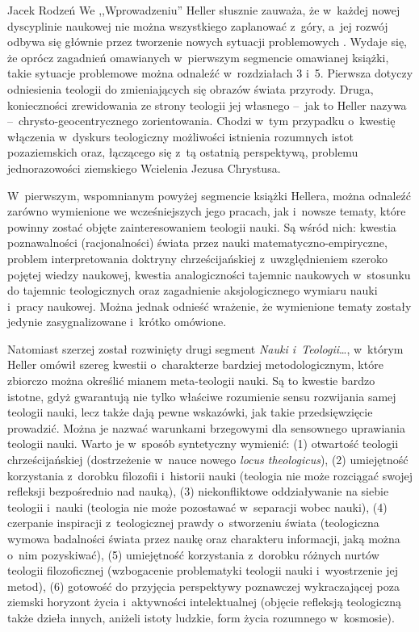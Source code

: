 \begin{newrevplenv}{Jacek Rodzeń}
We ,,Wprowadzeniu'' Heller słusznie zauważa, że w~każdej nowej dyscyplinie naukowej nie można wszystkiego zaplanować z~góry, a~jej rozwój odbywa się głównie przez tworzenie nowych sytuacji problemowych
\parencite[][s.~16]{heller_nauka_2019}. %
 Wydaje się, że oprócz zagadnień omawianych w~pierwszym segmencie omawianej książki, takie sytuacje problemowe można odnaleźć w~rozdziałach 3 i~5. Pierwsza dotyczy odniesienia teologii do zmieniających się obrazów świata przyrody. Druga, konieczności zrewidowania ze strony teologii jej własnego --~jak to Heller nazywa --~chrysto-geocentrycznego zorientowania. Chodzi w~tym przypadku o~kwestię włączenia w~dyskurs teologiczny możliwości istnienia rozumnych istot pozaziemskich oraz, łączącego się z~tą ostatnią perspektywą, problemu jednorazowości ziemskiego Wcielenia Jezusa Chrystusa.

W~pierwszym, wspomnianym powyżej segmencie książki Hellera, można odnaleźć zarówno wymienione we wcześniejszych jego pracach, jak i~nowsze tematy, które powinny zostać objęte zainteresowaniem teologii nauki. Są wśród nich: kwestia poznawalności (racjonalności) świata przez nauki matematyczno-empiryczne, problem interpretowania doktryny chrześcijańskiej z~uwzględnieniem szeroko pojętej wiedzy naukowej, kwestia analogiczności tajemnic naukowych w~stosunku do tajemnic teologicznych oraz zagadnienie aksjologicznego wymiaru nauki i~pracy naukowej. Można jednak odnieść wrażenie, że wymienione tematy zostały jedynie zasygnalizowane i~krótko omówione.

Natomiast szerzej został rozwinięty drugi segment \textit{Nauki i~Teologii}…, w~którym Heller omówił szereg kwestii o~charakterze bardziej metodologicznym, które zbiorczo można określić mianem meta-teologii nauki. Są to kwestie bardzo istotne, gdyż gwarantują nie tylko właściwe rozumienie sensu rozwijania samej teologii nauki, lecz także dają pewne wskazówki, jak takie przedsięwzięcie prowadzić. Można je nazwać warunkami brzegowymi dla sensownego uprawiania teologii nauki. Warto je w~sposób syntetyczny wymienić: (1) otwartość teologii chrześcijańskiej (dostrzeżenie w~nauce nowego \textit{locus theologicus}), (2) umiejętność korzystania z~dorobku filozofii i~historii nauki (teologia nie może rozciągać swojej refleksji bezpośrednio nad nauką), (3) niekonfliktowe oddziaływanie na siebie teologii i~nauki (teologia nie może pozostawać w~separacji wobec nauki), (4) czerpanie inspiracji z~teologicznej prawdy o~stworzeniu świata (teologiczna wymowa badalności świata przez naukę oraz charakteru informacji, jaką można o~nim pozyskiwać), (5) umiejętność korzystania z~dorobku różnych nurtów teologii filozoficznej (wzbogacenie problematyki teologii nauki i~wyostrzenie jej metod), (6) gotowość do przyjęcia perspektywy poznawczej wykraczającej poza ziemski horyzont życia i~aktywności intelektualnej (objęcie refleksją teologiczną także dzieła innych, aniżeli istoty ludzkie, form życia rozumnego w~kosmosie).


\end{newrevplenv}
